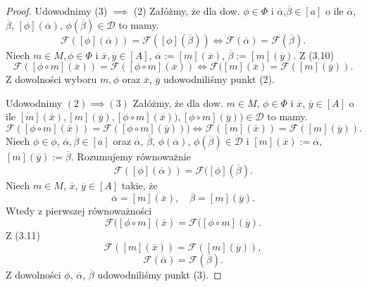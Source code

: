 \documentclass[12pt,a4paper]{report}
\newcommand{\domkniecie}[1]{\left[ {#1} \right] }
\begin{document}
\begin{proof}
Udowodnimy (3) $\implies$ (2)
Załóżmy, że dla dow. $\phi \in \Phi$ i $\overline{\alpha}$,$ \overline{\beta} \in \domkniecie{a}$ o ile $\overline{\alpha}$, $\overline{\beta}$, $\domkniecie{\phi}(\overline{\alpha})$, $\phi(\overline{\beta}) \in \mathcal{D}$ to mamy.
\begin{equation}
\mathcal{F}(\domkniecie{\phi}(\overline{\alpha}))=\mathcal{F}(\domkniecie{\phi}(\overline{\beta})) \iff \mathcal{F}(\overline{\alpha})=\mathcal{F}(\overline{\beta}).
\end{equation}
Niech $m\in M, \phi\in \Phi$ i $\overline{x}, \overline{y} \in \domkniecie{A}$, $\overline{\alpha}:=\domkniecie{m}(\overline{x})$, $\overline{\beta}:=\domkniecie{m}(\overline{y})$. Z (3.10)
$$
\mathcal{F}(\domkniecie{\phi\circ m}(\overline{x}))=\mathcal{F}(\domkniecie{\phi\circ m}(\overline{x})) \iff \mathcal{F}(\domkniecie{m} (\overline{x})=\mathcal{F}(\domkniecie{m}(\overline{y})).
$$
Z dowolności wyboru $m, \phi$ oraz $\overline{x}$, $\overline{y}$ udowodniliśmy punkt (2).

Udowodnimy $(2) \implies (3)$
Załóżmy, że dla dow. $m \in M$, $\phi \in \Phi$ i $\overline{x}$, $\overline{y} \in \domkniecie{A}$ o ile $\domkniecie{m}(\overline{x}), \domkniecie{
m}(\overline{y}), \domkniecie{\phi\circ m}(\overline{x})), \domkniecie{\phi\circ m}(\overline{y})) \in \mathcal{D}$ to mamy.
\begin{equation}
\mathcal{F}(\domkniecie{\phi \circ m}(\overline{x}))=\mathcal{F}(\domkniecie{\phi \circ m}(\overline{y}))) \iff \mathcal{F}(\domkniecie{m}(\overline{x}))=\mathcal{F}(\domkniecie{m}(\overline{y})).
\end{equation}
Niech $\phi \in \phi$, $\overline{\alpha}, \overline{\beta} \in \domkniecie{a}$ oraz $\overline{\alpha}$, $\overline{\beta}$, $\phi(\overline{\alpha})$, $\phi(\overline{\beta}) \in \mathcal{D}$ i $\domkniecie{m}(\overline{x}):=\overline{\alpha}$,  $\domkniecie{m}(\overline{y}):=\overline{\beta}$. 
Rozumujemy równoważnie
$$
\mathcal{F}(\domkniecie{\phi}(\overline{\alpha}))=\mathcal{F}(\domkniecie{\phi}(\overline{\beta}).
$$
Niech $m \in M$, $\overline{x}$, $\overline{y} \in \domkniecie{A}$ takie, że
$$
\overline{\alpha}=\domkniecie{m}(\overline{x}), \quad \overline{\beta}=\domkniecie{m}(\overline{y}).
$$
Wtedy z pierwszej równoważności
$$
\mathcal{F}(\domkniecie{\phi \circ m}(\overline{x})=\mathcal{F}(\domkniecie{\phi \circ m}(\overline{y}).
$$
Z (3.11)
$$
\mathcal{F}(\domkniecie{m}(\overline{x}))=\mathcal{F}(\domkniecie{m}(\overline{y})), 
$$
$$
\mathcal{F}(\overline{\alpha})=\mathcal{F}(\overline{\beta}).
$$
Z dowolności $\phi$, $\overline{\alpha}$, $\overline{\beta}$ udowodniliśmy punkt (3).
\end{proof}
\end{document}

